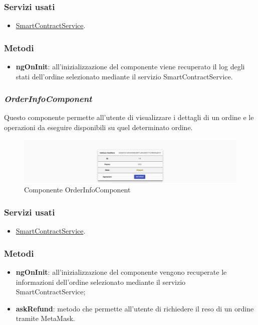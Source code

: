 \subsubsection{Servizi usati}
\begin{itemize}
    \item \hyperref[sec:smart-contract-service]{SmartContractService}.
\end{itemize}

\subsubsection{Metodi}
\begin{itemize}
    \item \textbf{ngOnInit}: all’inizializzazione del componente viene recuperato il log degli stati dell'ordine selezionato mediante il servizio SmartContractService.
\end{itemize}


\subsubsection*{\textit{OrderInfoComponent}}
\label{sec:order-info-component}
Questo componente permette all'utente di visualizzare i dettagli di un ordine e le operazioni da eseguire disponibili su quel determinato ordine.

\begin{figure}[!h] 
    \centering 
    \includegraphics[width=1\columnwidth]{immagini/componenti/orderinfo.png} 
    \caption{Componente OrderInfoComponent}
\end{figure}

\subsubsection{Servizi usati}
\begin{itemize}
    \item \hyperref[sec:smart-contract-service]{SmartContractService}.
\end{itemize}

\subsubsection{Metodi}
\begin{itemize}
    \item \textbf{ngOnInit}: all’inizializzazione del componente vengono recuperate le informazioni dell'ordine selezionato mediante il servizio SmartContractService;
    \item \textbf{askRefund}: metodo che permette all'utente di richiedere il reso di un ordine tramite MetaMask.
\end{itemize}


